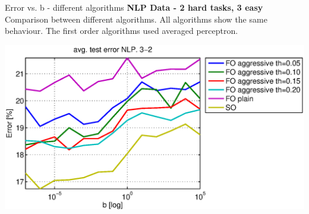 \documentclass{beamer}
\begin{document}
\begin{frame}{Error vs. b - different algorithms}
\textbf{NLP Data - 2 hard tasks, 3 easy} \newline
Comparison between different algorithms. All algorithms show the same behaviour. The first order algorithms used averaged perceptron. \newline

\begin{centering}

\includegraphics[width=1\textwidth]{figs/NLP_SO_3_2_mean_error_alg1.eps}

\end{centering}

\end{frame}


%
%
\end{document}
